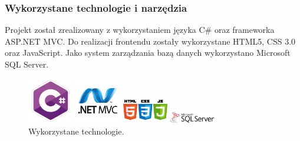 \documentclass{article}
\begin{document}
\subsubsection{Wykorzystane technologie i narzędzia}

Projekt został zrealizowany z wykorzystaniem języka C\# oraz frameworka ASP.NET MVC. Do realizacji frontendu zostały wykorzystane HTML5, CSS 3.0 oraz JavaScript. Jako system zarządzania bazą danych wykorzystano Microsoft SQL Server.

\begin{figure}[h]
\centering
		\begin{minipage}{2cm}
			\includegraphics[width=2cm]{c_hasztag.png}
		\end{minipage}
		\begin{minipage}{2cm}
			\includegraphics[width=2cm]{asp_net-MVC.png}
		\end{minipage}
		\begin{minipage}{2cm}
			\includegraphics[width=2cm]{html.png}
		\end{minipage}
		\begin{minipage}{2cm}
			\includegraphics[width=2cm]{sql.png}
		\end{minipage}
	\caption{Wykorzystane technologie.}
	\label{fig:technologie}
\end{figure}
\end{document}
